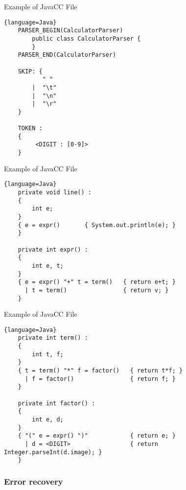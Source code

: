 \begin{bibunit}[apalike]
\begin{frame}[fragile]{Example of JavaCC File }
	\begin{lstlisting}{language=Java}
	PARSER_BEGIN(CalculatorParser)
	    public class CalculatorParser {
	    }
	PARSER_END(CalculatorParser)

	SKIP: {
	       " "
	    |  "\t"
	    |  "\n"
	    |  "\r"
	}

	TOKEN :
	{
	     <DIGIT : [0-9]>
	}
	\end{lstlisting}
\end{frame}

\begin{frame}[fragile]{Example of JavaCC File }
	\begin{lstlisting}{language=Java}
	private void line() :
	{
	    int e;
	}
	{ e = expr()       { System.out.println(e); }
	}

	private int expr() :
	{
	    int e, t;
	}
	{ e = expr() "+" t = term()   { return e+t; }
	  | t = term()                { return v; }
	}
	\end{lstlisting}
\end{frame}

\begin{frame}[fragile]{Example of JavaCC File }
	\begin{lstlisting}{language=Java}
	private int term() :
	{
	    int t, f;
	}
	{ t = term() "*" f = factor()   { return t*f; }
	  | f = factor()                { return f; }
	}

	private int factor() :
	{
	    int e, d;
	}
	{ "(" e = expr() ")"            { return e; }
	  | d = <DIGIT>                 { return Integer.parseInt(d.image); }
	}
	\end{lstlisting}
\end{frame}

\subsubsection{Error recovery}

\tableofcontentslide[sectionstyle={show/shaded},subsectionstyle={show/shaded/hide},subsubsectionstyle={show/shaded/hide/hide}]


\end{bibunit}
